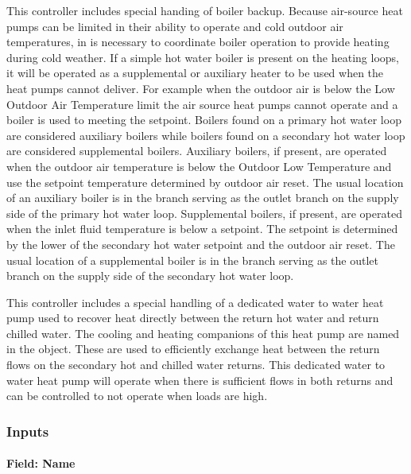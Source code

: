 This controller includes special handing of boiler backup.  Because air-source heat pumps can be limited in their ability to operate and cold outdoor air temperatures, in is necessary to coordinate boiler operation to provide heating during cold weather.  If a simple hot water boiler is present on the heating loops, it will be operated as a supplemental or auxiliary heater to be used when the heat pumps cannot deliver.  For example when the outdoor air is below the Low Outdoor Air Temperature limit the air source heat pumps cannot operate and a boiler is used to meeting the setpoint.  Boilers found on a primary hot water loop are considered auxiliary boilers while boilers found on a secondary hot water loop are considered supplemental boilers.  Auxiliary boilers, if present, are operated when the outdoor air temperature is below the Outdoor Low Temperature and use the setpoint temperature determined by outdoor air reset.  The usual location of an auxiliary boiler is in the branch serving as the outlet branch on the supply side of the primary hot water loop.  Supplemental boilers, if present, are operated when the inlet fluid temperature is below a setpoint.  The setpoint is determined by the lower of the secondary hot water setpoint and the outdoor air reset.  The usual location of a supplemental boiler is in the branch serving as the outlet branch on the supply side of the secondary hot water loop.

This controller includes a special handling of a dedicated water to water heat pump used to recover heat directly between the return hot water and return chilled water.  The cooling and heating companions of this heat pump are named in the object.  These are used to efficiently exchange heat between the return flows on the secondary hot and chilled water returns.  This dedicated water to water heat pump will operate when there is sufficient flows in both returns and can be controlled to not operate when loads are high.  

\subsubsection{Inputs}\label{inputs-plantequipmentoperationchillerheaterchangeover}

\paragraph{Field: Name}\label{field-name-plantequipmentoperationchillerheaterchangeover}


